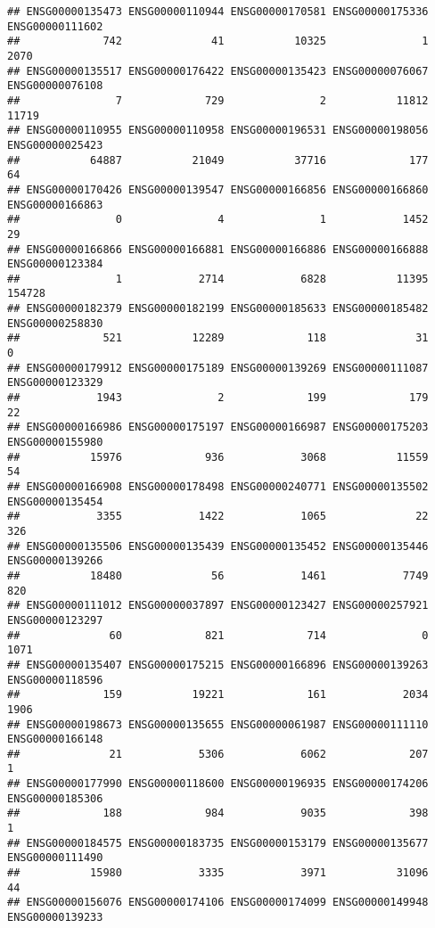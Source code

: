 \documentclass[
]{article}
\begin{document}
\begin{verbatim}
## ENSG00000135473 ENSG00000110944 ENSG00000170581 ENSG00000175336 ENSG00000111602 
##             742              41           10325               1            2070 
## ENSG00000135517 ENSG00000176422 ENSG00000135423 ENSG00000076067 ENSG00000076108 
##               7             729               2           11812           11719 
## ENSG00000110955 ENSG00000110958 ENSG00000196531 ENSG00000198056 ENSG00000025423 
##           64887           21049           37716             177              64 
## ENSG00000170426 ENSG00000139547 ENSG00000166856 ENSG00000166860 ENSG00000166863 
##               0               4               1            1452              29 
## ENSG00000166866 ENSG00000166881 ENSG00000166886 ENSG00000166888 ENSG00000123384 
##               1            2714            6828           11395          154728 
## ENSG00000182379 ENSG00000182199 ENSG00000185633 ENSG00000185482 ENSG00000258830 
##             521           12289             118              31               0 
## ENSG00000179912 ENSG00000175189 ENSG00000139269 ENSG00000111087 ENSG00000123329 
##            1943               2             199             179              22 
## ENSG00000166986 ENSG00000175197 ENSG00000166987 ENSG00000175203 ENSG00000155980 
##           15976             936            3068           11559              54 
## ENSG00000166908 ENSG00000178498 ENSG00000240771 ENSG00000135502 ENSG00000135454 
##            3355            1422            1065              22             326 
## ENSG00000135506 ENSG00000135439 ENSG00000135452 ENSG00000135446 ENSG00000139266 
##           18480              56            1461            7749             820 
## ENSG00000111012 ENSG00000037897 ENSG00000123427 ENSG00000257921 ENSG00000123297 
##              60             821             714               0            1071 
## ENSG00000135407 ENSG00000175215 ENSG00000166896 ENSG00000139263 ENSG00000118596 
##             159           19221             161            2034            1906 
## ENSG00000198673 ENSG00000135655 ENSG00000061987 ENSG00000111110 ENSG00000166148 
##              21            5306            6062             207               1 
## ENSG00000177990 ENSG00000118600 ENSG00000196935 ENSG00000174206 ENSG00000185306 
##             188             984            9035             398               1 
## ENSG00000184575 ENSG00000183735 ENSG00000153179 ENSG00000135677 ENSG00000111490 
##           15980            3335            3971           31096              44 
## ENSG00000156076 ENSG00000174106 ENSG00000174099 ENSG00000149948 ENSG00000139233 

\end{verbatim}
\end{document}
